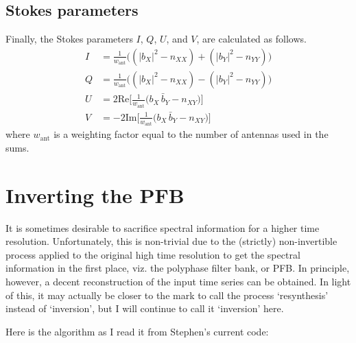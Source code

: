 \documentclass{article}
\begin{document}
\subsection{Stokes parameters}

Finally, the Stokes parameters $I$, $Q$, $U$, and $V$, are calculated as follows.
\begin{align}
    I &= \frac{1}{w_\text{ant}}\bigg((|b_X|^2 - n_{XX}) + (|b_Y|^2 - n_{YY})\bigg) \\
    Q &= \frac{1}{w_\text{ant}}\bigg((|b_X|^2 - n_{XX}) - (|b_Y|^2 - n_{YY})\bigg) \\
    U &=  2 \text{Re}\bigg[\frac{1}{w_\text{ant}}\bigg(b_X\,\bar{b}_Y - n_{XY}\bigg)\bigg]\\
    V &= -2 \text{Im}\bigg[\frac{1}{w_\text{ant}}\bigg(b_X\,\bar{b}_Y - n_{XY}\bigg)\bigg]
\end{align}
where $w_\text{ant}$ is a weighting factor equal to the number of antennas used in the sums.

\section{Inverting the PFB}

It is sometimes desirable to sacrifice spectral information for a higher time resolution.
Unfortunately, this is non-trivial due to the (strictly) non-invertible process applied to the original high time resolution to get the spectral information in the first place, viz. the polyphase filter bank, or PFB.
In principle, however, a decent reconstruction of the input time series can be obtained.
In light of this, it may actually be closer to the mark to call the process `resynthesis' instead of `inversion', but I will continue to call it `inversion' here.

Here is the algorithm as I read it from Stephen's current code:\\[10pt]
\newcommand{\blue}[1]{{\color{blue}#1}}
\newcommand{\red}[1]{{\color{red}#1}}
\newcommand{\arrsize}[1]{{\color{red}[}#1{\color{red}]}}
\newcommand{\vrbl}[1]{{\texttt{\blue{#1}}}}
\end{document}
